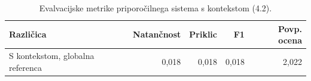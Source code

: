 \begin{table}[h]
\centering
\caption{Evalvacijske metrike priporočilnega sistema s kontekstom (4.2).}
\label{tab:evaluation_metrics_4_2}
\begin{tabular}{lrrrr}
\toprule
Različica & Natančnost & Priklic & F1 & Povp. ocena \\
\midrule
S kontekstom, globalna referenca & 0,018 & 0,018 & 0,018 & 2,022 \\
\bottomrule
\end{tabular}

\end{table}
